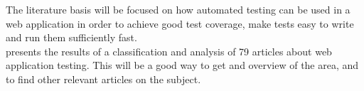 
The literature basis will be focused on how automated testing can be used
in a web application in order to achieve good test coverage, make tests
easy to write and run them sufficiently fast.\\

\citet{mappingstudy} presents the results of a classification and
analysis of 79 articles about web application testing. This will be a
good way to get and overview of the area, and to find other relevant
articles on the subject.\\



